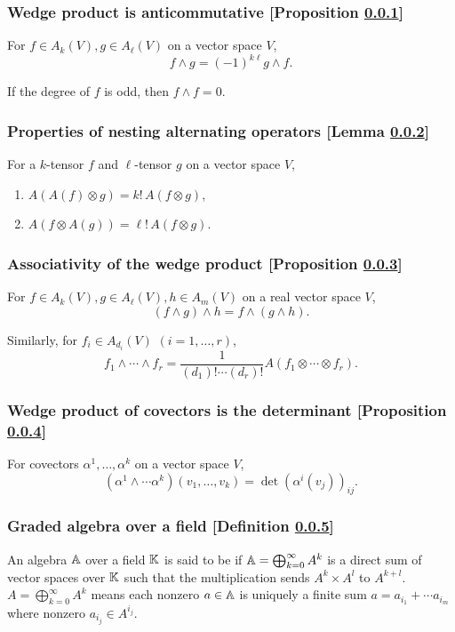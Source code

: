 \subsubsection{Wedge product is anticommutative [Proposition \ref{wedge-product-is-anticommutative}]}\label{wedge-product-is-anticommutative}
For $f \in A_k (V), g \in A_\ell(V)$ on a vector space $V$,
\[
f \wedge g = (-1)^{k\ell} g \wedge f.
\]

If the degree of $f$ is odd, then $f \wedge f = 0$.

\subsubsection{Properties of nesting alternating operators [Lemma \ref{properties-of-nesting-alternating-operators}]}\label{properties-of-nesting-alternating-operators}
For a $k$-tensor $f$ and $\ell$-tensor $g$ on a vector space $V$,
\begin{enumerate}
\item $A(A(f)\otimes g) = k!\,A(f\otimes g)$,
\item $A(f\otimes A(g)) = \ell!\,A(f\otimes g)$.    
\end{enumerate}

\subsubsection{Associativity of the wedge product [Proposition \ref{associativity-of-the-wedge-product}]}\label{associativity-of-the-wedge-product}
For $f \in A_k(V), g \in A_\ell(V), h \in A_m(V)$ on a real vector space $V$,
\[
(f \wedge g) \wedge h = f \wedge ( g \wedge h).
\]

Similarly, for $f_i \in A_{d_i}(V)$ $(i = 1, \dotsc, r)$,
\[
f_1 \wedge \dotsb \wedge f_r = \frac1{(d_1)!\dotsm (d_r)!} A(f_1 \otimes \dotsm \otimes f_r).
\]

\subsubsection{Wedge product of covectors is the determinant [Proposition \ref{wedge-product-of-covectors-is-the-determinant}]}\label{wedge-product-of-covectors-is-the-determinant}
For covectors $\alpha^1, \dotsc , \alpha^k$ on a vector space $V$,
\[
(\alpha^1\wedge \dotsm \alpha^k)(v_1,\dotsc, v_k) = \det (\alpha^i (v_j))_{ij}.
\]

\subsubsection{Graded algebra over a field [Definition \ref{graded-algebra-over-a-field}]}\label{graded-algebra-over-a-field}
An algebra $\mathbb{A}$ over a field $\mathbb{K}$ is said to be  if $\mathbb{A} = \bigoplus_{k = 0}^\infty A^k$ is a direct sum of vector spaces over $\mathbb{K}$ such that the multiplication sends $A^k \times A^l$ to $A^{k+l}$. $A = \bigoplus_{k = 0}^\infty A^k$ means each nonzero $a \in \mathbb{A}$ is uniquely a finite sum $a = a_{i_1} + \dotsb a_{i_m}$ where nonzero $a_{i_j} \in A^{i_j}$.

